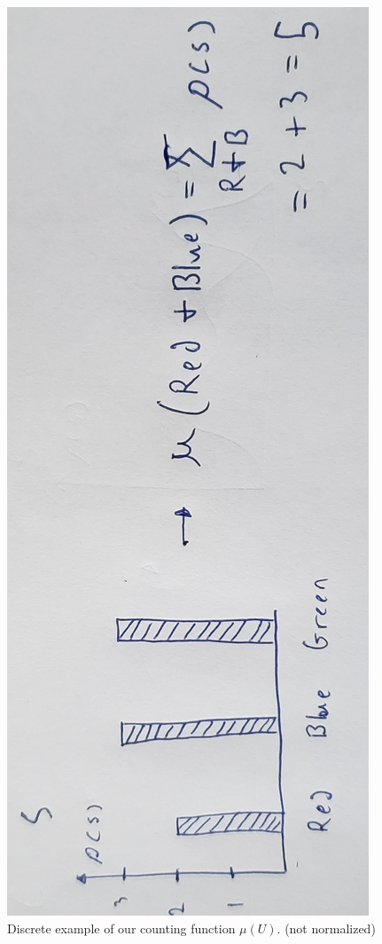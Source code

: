 \documentclass{article}
\begin{document}
\begin{figure}[!ht]
\centerline{\includegraphics[width=\textwidth,angle=-90,scale=.35]{diagram3.jpg}}
\caption{Discrete example of our counting function $\mu(U)$. (not normalized)}
\end{figure}
	
\end{document}
